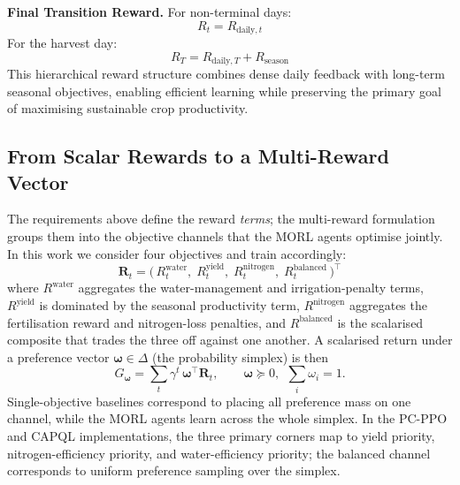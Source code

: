 \vspace{0.2cm}
\noindent\textbf{Final Transition Reward.}
For non-terminal days:
\begin{equation}
R_t = R_{\text{daily},t}
\end{equation}
For the harvest day:
\begin{equation}
R_T = R_{\text{daily},T} + R_{\text{season}}
\label{eq:transition_scalar}
\end{equation}
This hierarchical reward structure combines dense daily feedback with long-term seasonal
objectives, enabling efficient learning while preserving the primary goal of maximising
sustainable crop productivity.

\subsection{From Scalar Rewards to a Multi-Reward Vector}
The requirements above define the reward \emph{terms}; the multi-reward formulation
groups them into the objective channels that the MORL agents optimise jointly. In this
work we consider four objectives and train accordingly:
\begin{equation}
\mathbf{R}_t = \big(\, R^{\text{water}}_t,\; R^{\text{yield}}_t,\; R^{\text{nitrogen}}_t,\; R^{\text{balanced}}_t \,\big)^{\!\top}
\end{equation}
where $R^{\text{water}}$ aggregates the water-management and irrigation-penalty terms,
$R^{\text{yield}}$ is dominated by the seasonal productivity term, $R^{\text{nitrogen}}$
aggregates the fertilisation reward and nitrogen-loss penalties, and
$R^{\text{balanced}}$ is the scalarised composite that trades the three off against one
another. A scalarised return under a preference vector
$\boldsymbol{\omega}\in\Delta$ (the probability simplex) is then
\begin{equation}
G_{\boldsymbol{\omega}} = \sum_{t} \gamma^{t}\, \boldsymbol{\omega}^{\top}\mathbf{R}_t ,
\qquad \boldsymbol{\omega}\succeq 0,\ \ \textstyle\sum_i \omega_i = 1 .
\label{eq:scalarized}
\end{equation}
Single-objective baselines correspond to placing all preference mass on one channel,
while the MORL agents learn across the whole simplex. In the PC-PPO and CAPQL
implementations, the three primary corners map to yield priority, nitrogen-efficiency
priority, and water-efficiency priority; the balanced channel corresponds to uniform
preference sampling over the simplex.



